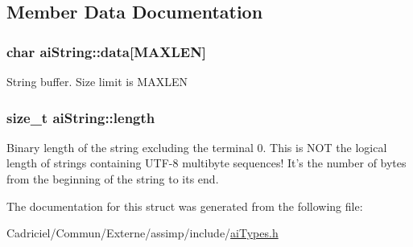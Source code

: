 \subsection{Member Data Documentation}
\hypertarget{structai_string_aa90b1da7d347a3dcca0a95061e6ea41d}{
\subsubsection[{data}]{\setlength{\rightskip}{0pt plus 5cm}char ai\-String\-::data\mbox{[}{\bf M\-A\-X\-L\-E\-N}\mbox{]}}}\label{structai_string_aa90b1da7d347a3dcca0a95061e6ea41d}
String buffer. Size limit is M\-A\-X\-L\-E\-N \hypertarget{structai_string_a7d77c2031ff0340746aa046f7fbcf313}{
\subsubsection[{length}]{\setlength{\rightskip}{0pt plus 5cm}size\-\_\-t ai\-String\-::length}}\label{structai_string_a7d77c2031ff0340746aa046f7fbcf313}
Binary length of the string excluding the terminal 0. This is N\-O\-T the logical length of strings containing U\-T\-F-\/8 multibyte sequences! It's the number of bytes from the beginning of the string to its end. 

The documentation for this struct was generated from the following file\-:\begin{DoxyCompactItemize}
\item 
Cadriciel/\-Commun/\-Externe/assimp/include/\hyperlink{ai_types_8h}{ai\-Types.\-h}\end{DoxyCompactItemize}
